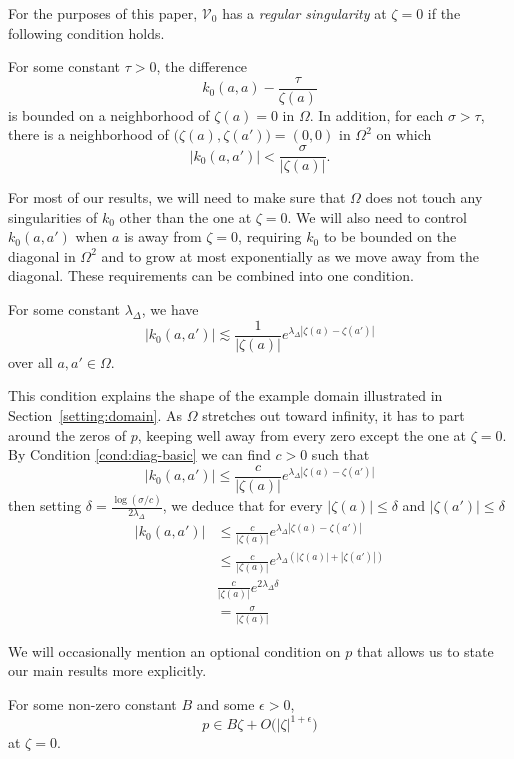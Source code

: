 \documentclass{article}
\makeatletter
\theoremstyle{definition}
\theoremstyle{plain}
\newcommand{\condconst}[2]{\item[($\text{\textsc{#1}} \mid #2$)]\protected@edef\@currentlabel{$\text{\textsc{#1}} \mid #2$}}
\newcommand{\hardpart}{\mathcal{V}_0}
\newcommand{\hardker}{k_0}
\newcommand{\domain}{\Omega}
\newenvironment{verify}{\color{veriforest}}{\color{black}}
\makeatother
\begin{document}
For the purposes of this paper, $\hardpart$ has a {\em regular singularity} at $\zeta=0$ if the following condition holds.
\begin{conditions}
\condconst{sing}{\tau}\label{cond:sing}For some constant $\tau > 0$, the difference
\[ \hardker(a, a) - \frac{\tau}{\zeta(a)} \]
is bounded on a neighborhood of $\zeta(a) = 0$ in $\domain$.
In addition, for each $\sigma > \tau$, there is a neighborhood of $\big(\zeta(a), \zeta(a')\big) = (0, 0)$ in $\Omega^2$ on which
\[ |\hardker(a, a')| < \frac{\sigma}{|\zeta(a)|}. \]
\end{conditions}
For most of our results, we will need to make sure that $\domain$ does not touch any singularities of $\hardker$ other than the one at $\zeta = 0$. We will also need to control $\hardker(a, a')$ when $a$ is away from $\zeta = 0$, requiring $\hardker$ to be bounded on the diagonal in $\domain^2$ and to grow at most exponentially as we move away from the diagonal. These requirements can be combined into one condition.
\begin{conditions}
\condconst{diag$_0$}{\lambda_\Delta}\label{cond:diag-basic} For some constant $\lambda_\Delta$, we have
\[ |\hardker(a, a')| \lesssim \frac{1}{|\zeta(a)|} e^{\lambda_\Delta|\zeta(a)-\zeta(a')|} \]
over all $a, a' \in \domain$.
\end{conditions}
This condition explains the shape of the example domain illustrated in Section~\ref{setting:domain}. As $\domain$ stretches out toward infinity, it has to part around the zeros of $p$, keeping well away from every zero except the one at $\zeta = 0$.
\begin{verify}
By Condition \eqref{cond:diag-basic} we can find $c>0$ such that \[ | \hardker(a, a') | \le \frac{c}{|\zeta(a)|} e^{\lambda_\Delta|\zeta(a)-\zeta(a')|} \]
then setting $\delta=\frac{\log(\sigma/c)}{2\lambda_\Delta}$, we deduce that for every $|\zeta(a)|\le\delta$ and  $|\zeta(a')|\le\delta$
\begin{align*}
|\hardker(a,a')|&\le \frac{c}{|\zeta(a)|} e^{\lambda_\Delta|\zeta(a)-\zeta(a')|}\\
&\le \frac{c}{|\zeta(a)|} e^{\lambda_\Delta(|\zeta(a)|+|\zeta(a')|)}\\
&\frac{c}{|\zeta(a)|} e^{2\lambda_\Delta \delta}\\
&=\frac{\sigma}{|\zeta(a)|}
\end{align*}
\end{verify}

We will occasionally mention an optional condition on $p$ that allows us to state our main results more explicitly.
\begin{conditions}
\condconst{reg-p}{B, \epsilon}\label{cond:reg-p}
For some non-zero constant $B$ and some $\epsilon > 0$,
\[ p \in B\zeta + O\big(|\zeta|^{1 + \epsilon}\big) \]
at $\zeta = 0$.
\end{conditions}
\end{document}
